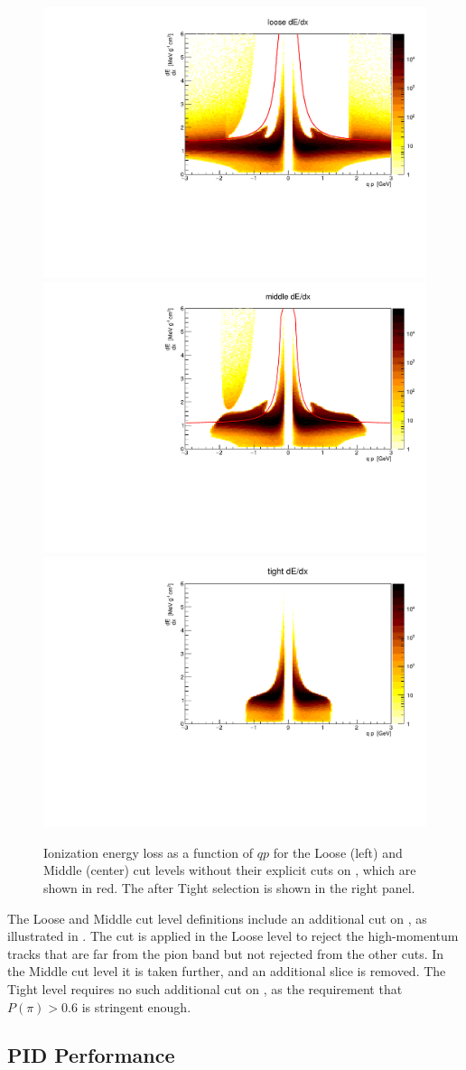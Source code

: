 \begin{figure}[t]
\includegraphics[width=.32\linewidth]{dedx_loose.pdf}
\includegraphics[width=.32\linewidth]{dedx_mid.pdf}
\includegraphics[width=.32\linewidth]{dedx_tight.pdf}
\caption{Ionization energy loss \dEdx as a function of $qp$ for the Loose (left) and Middle (center) cut levels without their explicit cuts on \dEdx, which are shown in red. The \dEdx after Tight selection is shown in the right panel.}
\label{fig:dedx}
\end{figure}

The Loose and Middle cut level definitions include an additional cut on \dEdx, as illustrated in .
The cut is applied in the Loose level to reject the high-momentum tracks that are far from the pion band but not rejected from the other cuts.
In the Middle cut level it is taken further, and an additional slice is removed.
The Tight level requires no such additional cut on \dEdx, as the requirement that $P(\pi) > 0.6$ is stringent enough.


\subsection{PID Performance}

